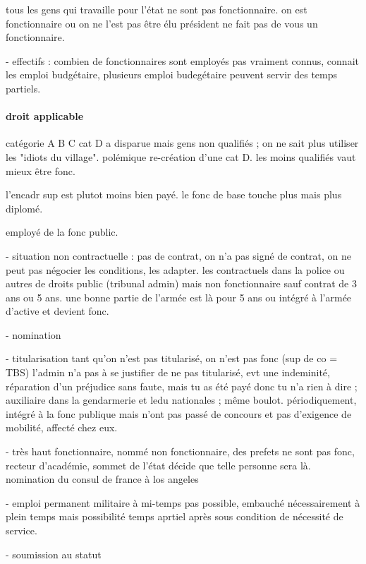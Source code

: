 \documentclass[a4paper,12pt]{article}
\begin{document}
tous les gens qui travaille pour l'état ne sont pas fonctionnaire.
on est fonctionnaire ou on ne l'est pas  
être élu président ne fait pas de vous un fonctionnaire.


- effectifs : combien de fonctionnaires sont employés pas vraiment connus, connait les emploi budgétaire, plusieurs emploi budegétaire peuvent servir des temps partiels.


\paragraph{droit applicable}
catégorie A B C 
cat D a disparue mais gens non qualifiés ; on ne sait plus utiliser les "idiots du village". polémique re-création
d'une cat D.
les moins qualifiés vaut mieux être fonc.

l'encadr sup est plutot moins bien payé.
le fonc de base touche plus mais plus diplomé.

employé de la fonc public.

- situation non contractuelle : pas de contrat, on n'a pas signé de contrat, 
on ne peut pas négocier les conditions, les adapter.
les contractuels dans la police ou autres de droits public (tribunal admin) mais non fonctionnaire
sauf contrat de 3 ans ou 5 ans. une bonne partie de l'armée est là pour 5 ans ou intégré à l'armée d'active
et devient fonc.


- nomination


- titularisation
tant qu'on n'est pas titularisé, on n'est pas fonc (sup de co = TBS)
l'admin n'a pas à se justifier de ne pas titularisé, evt une indeminité, réparation d'un préjudice sans faute,
mais tu as été payé donc tu n'a rien à dire ; auxiliaire dans la gendarmerie et ledu nationales ; même boulot.
périodiquement, intégré à la fonc publique mais n'ont pas passé de concours et pas d'exigence de mobilité, affecté
chez eux.


- très haut fonctionnaire, nommé non fonctionnaire, des prefets ne sont pas fonc, recteur d'académie, 
sommet de l'état décide que telle personne sera là.
nomination du consul de france à los angeles

- emploi permanent
militaire à mi-temps pas possible, embauché nécessairement à plein temps mais possibilité temps aprtiel après sous condition de nécessité de service.



- soumission au statut
\end{document}
